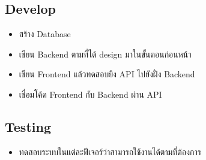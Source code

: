 \subsection{Develop}
\begin{itemize}
  \item สร้าง Database
  \item เขียน Backend ตามที่ได้ design มาในขั้นตอนก่อนหน้า
  \item เขียน Frontend แล้วทดสอบยิง API ไปยังฝั่ง Backend
  \item เชื่อมโค้ด Frontend กับ Backend ผ่าน API
\end{itemize}

\subsection{Testing}
\begin{itemize}
  \item ทดสอบระบบในแต่ละฟีเจอร์ว่าสามารถใช้งานได้ตามที่ต้องการ
\end{itemize}
